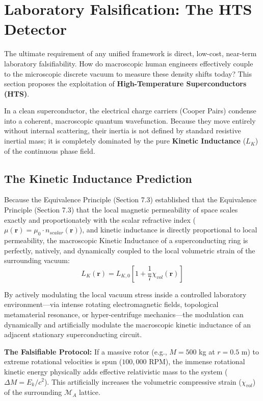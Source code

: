 \section{Laboratory Falsification: The HTS Detector}

The ultimate requirement of any unified framework is direct, low-cost, near-term laboratory falsifiability. How do macroscopic human engineers effectively couple to the microscopic discrete vacuum to measure these density shifts today? This section proposes the exploitation of \textbf{High-Temperature Superconductors (HTS)}. 

In a clean superconductor, the electrical charge carriers (Cooper Pairs) condense into a coherent, macroscopic quantum wavefunction. Because they move entirely without internal scattering, their inertia is not defined by standard resistive inertial mass; it is completely dominated by the pure \textbf{Kinetic Inductance} ($L_K$) of the continuous phase field.

\subsection{The Kinetic Inductance Prediction}
Because the Equivalence Principle (Section 7.3) established that the Equivalence Principle (Section 7.3) that the local magnetic permeability of space scales exactly and proportionately with the scalar refractive index ($\mu(\mathbf{r}) = \mu_0 \cdot n_{scalar}(\mathbf{r})$), and kinetic inductance is directly proportional to local permeability, the macroscopic Kinetic Inductance of a superconducting ring is perfectly, natively, and dynamically coupled to the local volumetric strain of the surrounding vacuum:
\begin{equation}
    L_K(\mathbf{r}) = L_{K,0} \left[ 1 + \frac{1}{7}\chi_{vol}(\mathbf{r}) \right]
\end{equation}

By actively modulating the local vacuum stress inside a controlled laboratory environment—via intense rotating electromagnetic fields, topological metamaterial resonance, or hyper-centrifuge mechanics—the modulation can dynamically and artificially modulate the macroscopic kinetic inductance of an adjacent stationary superconducting circuit. 

\textbf{The Falsifiable Protocol:}
If a massive rotor (e.g., $M = 500$ kg at $r=0.5$ m) to extreme rotational velocities is spun ($100,000$ RPM), the immense rotational kinetic energy physically adds effective relativistic mass to the system ($\Delta M = E_k / c^2$). This artificially increases the volumetric compressive strain ($\chi_{vol}$) of the surrounding $\mathcal{M}_A$ lattice. 

